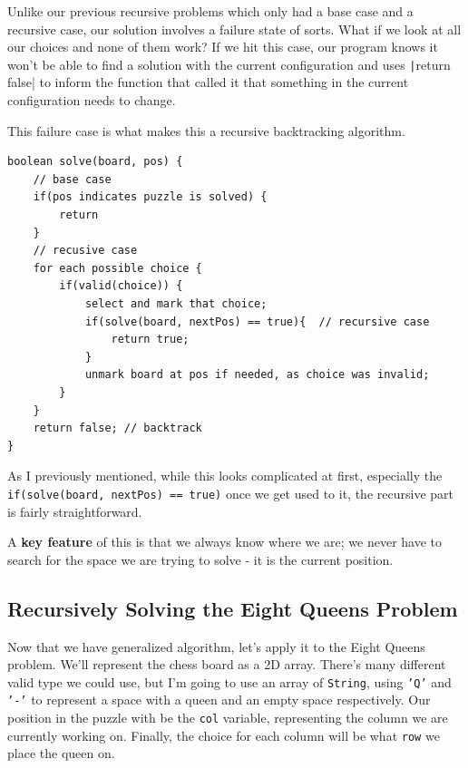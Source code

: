 Unlike our previous recursive problems which only had a base case and a recursive case,  our solution involves a failure state of sorts.   What if we look at all our choices and none of them work? If we hit this case, our program knows it won't be able to find a solution with the current configuration and uses \texttt|return false| to inform the function that called it that something in the current configuration needs to change.


This failure case is what makes this a recursive backtracking algorithm.


\begin{verbatim}
boolean solve(board, pos) {
	// base case
	if(pos indicates puzzle is solved) {
		return
	}
	// recusive case
	for each possible choice {
		if(valid(choice)) {
			select and mark that choice;
			if(solve(board, nextPos) == true){  // recursive case
				return true;
			}
			unmark board at pos if needed, as choice was invalid;
		}
	}
	return false; // backtrack
}
\end{verbatim}
	
As I previously mentioned, while this looks complicated at first, especially the \texttt{if(solve(board, nextPos) == true)}  once we get used to it, the recursive part is fairly straightforward.


A\textbf{ key feature }of this is that we always know where we are;  we never have to search for the space we are trying to solve - it is the current position.


\subsection{Recursively Solving the Eight Queens Problem}

Now that we have generalized algorithm, let's apply it to the Eight Queens problem.  
We'll represent the chess board as a 2D array.  There's many different valid type we could use, but I'm going to use an array of \texttt{String}, using \texttt{'Q'} and \texttt{'-'} to represent a space with a queen and an empty space respectively.  Our position in the puzzle with be the \texttt{col} variable, representing the column we are currently working on.  Finally, the choice for each column will be what \texttt{row} we place the queen on.

